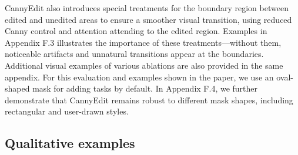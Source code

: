 \documentclass{article}
\begin{document}




CannyEdit also introduces special treatments for the boundary region between edited and unedited areas to ensure a smoother visual transition, using reduced Canny control and attention attending to the edited region. Examples in {Appendix F.3} illustrates the importance of these treatments—without them, noticeable artifacts and unnatural transitions appear at the boundaries. Additional visual examples of various ablations are also provided in the same appendix. For this evaluation and examples shown in the paper, we use an oval-shaped mask for adding tasks by default. In {Appendix F.4}, we further demonstrate that CannyEdit remains robust to different mask shapes, including rectangular and user-drawn styles.

\subsection{Qualitative examples}
\end{document}
